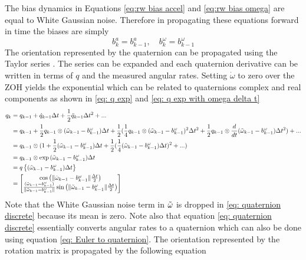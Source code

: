 The bias dynamics in Equations \eqref{eq:rw bias accel} and \eqref{eq:rw bias omega} are equal to White Gaussian noise. Therefore in propagating these equations forward in time the biases are simply
\begin{equation}
b^a_k = b^a_{k-1}, \quad b^{\omega}_k = b^{\omega}_{k-1}
\label{eq: bias discrete}
\end{equation}
The orientation represented by the quaternion can be propagated using the Taylor series \cite{Quaternion_Kinematics_for_the_Error-state_EKF}. The series can be expanded and each quaternion derivative can be written in terms of $q$ and the measured angular rates. Setting $\dot{\omega}$ to zero over the ZOH yields the exponential which can be related to quaternions complex and real components as shown in \eqref{eq: q exp} and \eqref{eq: q exp with omega delta t}
\begin{equation}
    \begin{split}
        q_k &= q_{k-1} + \dot{q}_{k-1} \Delta t + \frac{1}{2} \Ddot{q}_{k-1} \Delta t^2 + ...\\
         &= q_{k-1} + \frac{1}{2} q_{k-1} \otimes (\Tilde{\omega} _{k-1}- b^{\omega}_{k-1}) \Delta t + \frac{1}{2} (\frac{1}{4} q_{k-1} \otimes (\Tilde{\omega} _{k-1}- b^{\omega}_{k-1})^2 \Delta t^2 + \frac{1}{2} q_{k-1} \otimes \frac{d}{dt}(\Tilde{\omega} _{k-1}- b^{\omega}_{k-1}) \Delta t^2) + ...\\
        &= q_{k-1} \otimes (1 + \frac{1}{2} (\Tilde{\omega} _{k-1}- b^{\omega}_{k-1}) \Delta t + \frac{1}{2} (\frac{1}{4} (\Tilde{\omega} _{k-1}- b^{\omega}_{k-1}) \Delta t)^2 + ...)\\
        &= q_{k-1} \otimes \exp{(\Tilde{\omega} _{k-1}- b^{\omega}_{k-1}) \Delta t} \\
        &= q\left\{ (\Tilde{\omega}_{k-1} - b^{\omega}_{k-1}) \Delta t \right\} \\
        &= 
            \begin{bmatrix}
                \cos{\left(\|\Tilde{\omega}_{k-1} - b^{\omega}_{k-1}\|  \frac{\Delta t}{2} \right)} \\
                \frac{ (\Tilde{\omega}_{k-1} - b^{\omega}_{k-1})}{\|\Tilde{\omega}_{k-1} - b^{\omega}_{k-1}\|} \sin{\left( \|\Tilde{\omega}_{k-1} - b^{\omega}_{k-1}\|  \frac{\Delta t}{2} \right)} 
            \end{bmatrix}
    \end{split}
\label{eq: quaternion discrete}
\end{equation}
Note that the White Gaussian noise term in $\Tilde{\omega}$ is dropped in \eqref{eq: quaternion discrete} because its mean is zero. Note also that equation \eqref{eq: quaternion discrete} essentially converts angular rates to a quaternion which can also be done using equation \eqref{eq: Euler to quaternion}. The orientation represented by the rotation matrix is propagated by the following equation
